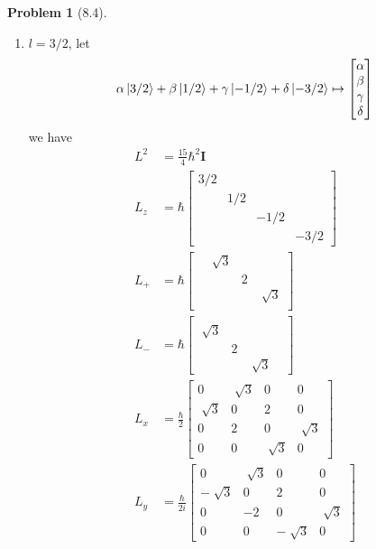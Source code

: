 \documentclass[twoside,11pt]{article}
\theoremstyle{definition}
\newtheorem{problem}{Problem}
\theoremstyle{remark}
\begin{document}
\begin{problem}[8.4]
\begin{enumerate}[label=Case \arabic*., leftmargin=*]
\item  $l=3/2$, let
\begin{align*}
    \alpha\ket{3/2} + \beta\ket{1/2} + \gamma\ket{-1/2} + \delta\ket{-3/2}
    \mapsto
    \begin{bmatrix}
        \alpha\\ \beta\\ \gamma\\ \delta
    \end{bmatrix}
\end{align*}
we have
\begin{align*}
    L^2 &= \frac{15}{4}\hbar^2\mathbf{I}\\
    L_z &= \hbar\begin{bmatrix}
        3/2 & & & \\
        & 1/2 & & \\
        & & -1/2 & \\ 
        & & & -3/2
    \end{bmatrix}\\
    L_+ &= \hbar\begin{bmatrix}
        & \sqrt[]{3} & & \\
        & & 2 & \\
        & & & \sqrt[]{3}\\
        & & & 
    \end{bmatrix}\\
    L_- &= \hbar\begin{bmatrix}
        & & & \\
        \sqrt[]{3} & & & \\
        & 2 & & \\ 
        & & \sqrt[]{3} & 
    \end{bmatrix}\\
    L_x &= \frac{\hbar}{2}\begin{bmatrix}
        0 & \sqrt[]{3} & 0 & 0\\
        \sqrt[]{3} & 0 & 2 & 0\\
        0 & 2 & 0 & \sqrt[]{3}\\
        0 & 0 & \sqrt[]{3} & 0
    \end{bmatrix}\\
    L_y &= \frac{\hbar}{2i}\begin{bmatrix}
        0 & \sqrt[]{3} & 0 & 0\\
        -\sqrt[]{3} & 0 & 2 & 0\\
        0 & -2 & 0 & \sqrt[]{3}\\
        0 & 0 & -\sqrt[]{3} & 0
    \end{bmatrix}
\end{align*}


\end{enumerate}
\end{problem}
\end{document}

